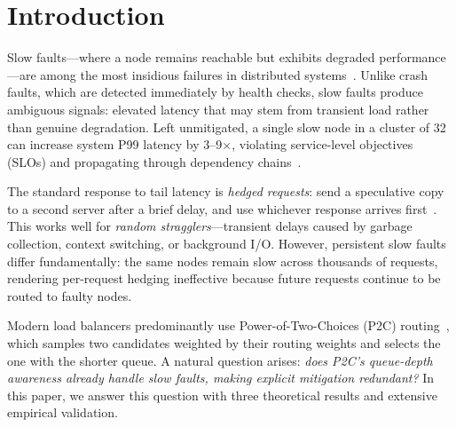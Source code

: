 \section{Introduction}
\label{sec:intro}

Slow faults---where a node remains reachable but exhibits degraded
performance---are among the most insidious failures in distributed
systems~\cite{huang2017gray, gunawi2018fail}. Unlike crash faults, which
are detected immediately by health checks, slow faults produce ambiguous
signals: elevated latency that may stem from transient load rather than
genuine degradation. Left unmitigated, a single slow node in a cluster of
32 can increase system P99 latency by 3--9$\times$, violating
service-level objectives (SLOs) and propagating through dependency
chains~\cite{dean2013tail}.

The standard response to tail latency is \emph{hedged requests}: send a
speculative copy to a second server after a brief delay, and use whichever
response arrives first~\cite{dean2013tail}. This works well for
\emph{random stragglers}---transient delays caused by garbage collection,
context switching, or background I/O. However, persistent slow faults
differ fundamentally: the same nodes remain slow across thousands of
requests, rendering per-request hedging ineffective because future requests
continue to be routed to faulty nodes.

Modern load balancers predominantly use Power-of-Two-Choices (P2C)
routing~\cite{mitzenmacher2001power}, which samples two candidates weighted
by their routing weights and selects the one with the shorter queue. A
natural question arises: \emph{does P2C's queue-depth awareness already
handle slow faults, making explicit mitigation redundant?} In this paper,
we answer this question with three theoretical results and extensive
empirical validation.

